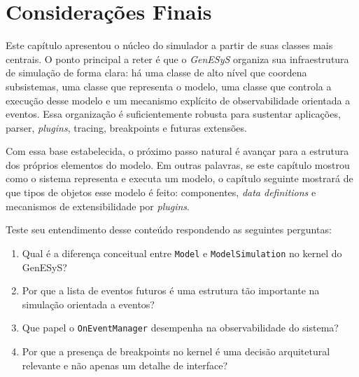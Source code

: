 \section{Considerações Finais}
\label{sec:cap7_consideracoes_finais}

Este capítulo apresentou o núcleo do simulador a partir de suas classes mais centrais. O ponto principal a reter é que o \textit{GenESyS} organiza sua infraestrutura de simulação de forma clara: há uma classe de alto nível que coordena subsistemas, uma classe que representa o modelo, uma classe que controla a execução desse modelo e um mecanismo explícito de observabilidade orientada a eventos. Essa organização é suficientemente robusta para sustentar aplicações, parser, \textit{plugins}, tracing, breakpoints e futuras extensões.

Com essa base estabelecida, o próximo passo natural é avançar para a estrutura dos próprios elementos do modelo. Em outras palavras, se este capítulo mostrou como o sistema representa e executa um modelo, o capítulo seguinte mostrará de que tipos de objetos esse modelo é feito: componentes, \textit{data definitions} e mecanismos de extensibilidade por \textit{plugins}.

Teste seu entendimento desse conteúdo respondendo as seguintes perguntas:

\begin{enumerate}
    \item Qual é a diferença conceitual entre \texttt{Model} e \texttt{ModelSimulation} no kernel do GenESyS?

    \item Por que a lista de eventos futuros é uma estrutura tão importante na simulação orientada a eventos?

    \item Que papel o \texttt{OnEventManager} desempenha na observabilidade do sistema?

    \item Por que a presença de breakpoints no kernel é uma decisão arquitetural relevante e não apenas um detalhe de interface?
\end{enumerate}